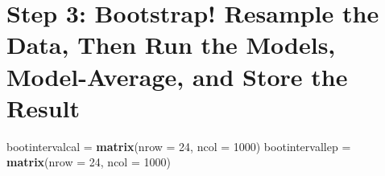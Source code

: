 \documentclass[]{article}
\newenvironment{Shaded}{\begin{snugshade}}{\end{snugshade}}
\newcommand{\KeywordTok}[1]{\textcolor[rgb]{0.13,0.29,0.53}{\textbf{#1}}}
\newcommand{\DataTypeTok}[1]{\textcolor[rgb]{0.13,0.29,0.53}{#1}}
\newcommand{\DecValTok}[1]{\textcolor[rgb]{0.00,0.00,0.81}{#1}}
\newcommand{\StringTok}[1]{\textcolor[rgb]{0.31,0.60,0.02}{#1}}
\newcommand{\NormalTok}[1]{#1}
\begin{document}
\section{Step 3: Bootstrap! Resample the Data, Then Run the Models,
Model-Average, and Store the
Result}\label{step-3-bootstrap-resample-the-data-then-run-the-models-model-average-and-store-the-result}

\begin{Shaded}
\begin{Highlighting}[]
\NormalTok{bootintervalcal =}\StringTok{ }\KeywordTok{matrix}\NormalTok{(}\DataTypeTok{nrow =} \DecValTok{24}\NormalTok{, }\DataTypeTok{ncol =} \DecValTok{1000}\NormalTok{)}
\NormalTok{bootintervallep =}\StringTok{ }\KeywordTok{matrix}\NormalTok{(}\DataTypeTok{nrow =} \DecValTok{24}\NormalTok{, }\DataTypeTok{ncol =} \DecValTok{1000}\NormalTok{)}



\end{Highlighting}
\end{Shaded}
\end{document}
